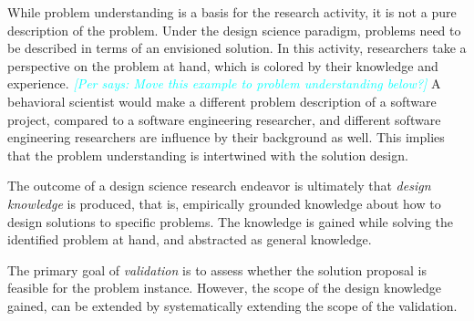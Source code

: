 \documentclass[graybox]{svmult}
\newcommand{\emelie}[1]{\textcolor{red}{{\it [Emelie says: #1]}}}
\newcommand{\per}[1]{\textcolor{cyan}{{\it [Per says: #1]}}}
\newcommand{\emelie}[1]{}
\newcommand{\per}[1]{}
\begin{document}
While problem understanding is a basis for the research activity, it is not a pure description of the problem. Under the design science paradigm, problems need to be described in terms of an envisioned solution. In this activity, researchers take a perspective on the problem at hand, which is colored by their knowledge and experience. \per{Move this example to problem understanding below?} A behavioral scientist would make a different problem description of a software project, compared to a software engineering researcher, and different software engineering researchers are influence by their background as well. This implies that the problem understanding is intertwined with the solution design.

The outcome of a design science research endeavor is ultimately that \emph{design knowledge} is produced, that is, empirically grounded knowledge about how to design solutions to specific problems. The knowledge is gained while solving the identified problem at hand, and abstracted as general knowledge. %


 The primary goal of \emph{validation} is to assess whether the solution proposal is feasible for the problem instance. However, the scope of the design knowledge gained, can be extended by systematically extending the scope of the validation. 
\end{document}
